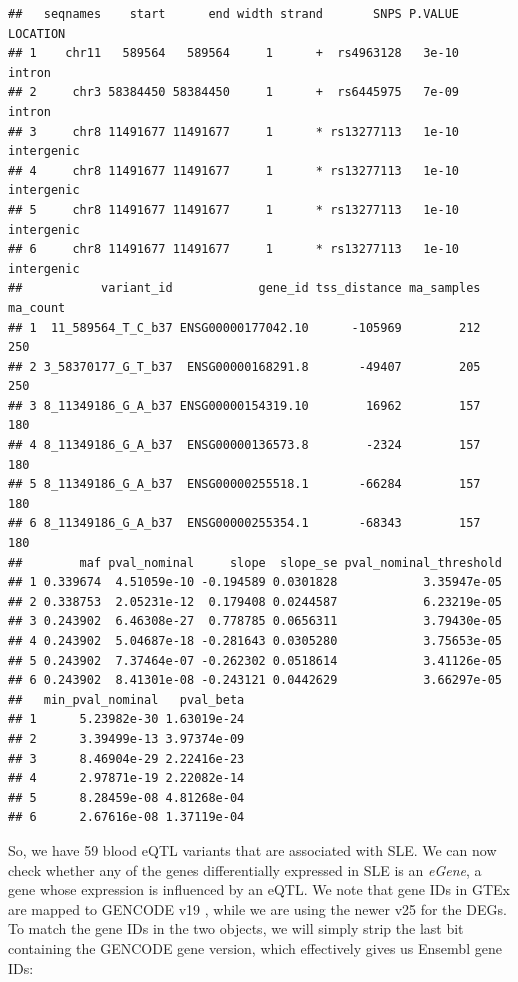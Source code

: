 \documentclass[9pt,a4paper,]{extarticle}
\begin{document}
\begin{verbatim}
##   seqnames    start      end width strand       SNPS P.VALUE   LOCATION
## 1    chr11   589564   589564     1      +  rs4963128   3e-10     intron
## 2     chr3 58384450 58384450     1      +  rs6445975   7e-09     intron
## 3     chr8 11491677 11491677     1      * rs13277113   1e-10 intergenic
## 4     chr8 11491677 11491677     1      * rs13277113   1e-10 intergenic
## 5     chr8 11491677 11491677     1      * rs13277113   1e-10 intergenic
## 6     chr8 11491677 11491677     1      * rs13277113   1e-10 intergenic
##           variant_id            gene_id tss_distance ma_samples ma_count
## 1  11_589564_T_C_b37 ENSG00000177042.10      -105969        212      250
## 2 3_58370177_G_T_b37  ENSG00000168291.8       -49407        205      250
## 3 8_11349186_G_A_b37 ENSG00000154319.10        16962        157      180
## 4 8_11349186_G_A_b37  ENSG00000136573.8        -2324        157      180
## 5 8_11349186_G_A_b37  ENSG00000255518.1       -66284        157      180
## 6 8_11349186_G_A_b37  ENSG00000255354.1       -68343        157      180
##        maf pval_nominal     slope  slope_se pval_nominal_threshold
## 1 0.339674  4.51059e-10 -0.194589 0.0301828            3.35947e-05
## 2 0.338753  2.05231e-12  0.179408 0.0244587            6.23219e-05
## 3 0.243902  6.46308e-27  0.778785 0.0656311            3.79430e-05
## 4 0.243902  5.04687e-18 -0.281643 0.0305280            3.75653e-05
## 5 0.243902  7.37464e-07 -0.262302 0.0518614            3.41126e-05
## 6 0.243902  8.41301e-08 -0.243121 0.0442629            3.66297e-05
##   min_pval_nominal   pval_beta
## 1      5.23982e-30 1.63019e-24
## 2      3.39499e-13 3.97374e-09
## 3      8.46904e-29 2.22416e-23
## 4      2.97871e-19 2.22082e-14
## 5      8.28459e-08 4.81268e-04
## 6      2.67616e-08 1.37119e-04
\end{verbatim}

So, we have 59 blood eQTL variants that are associated with SLE.
We can now check whether any of the genes differentially expressed in SLE is an \emph{eGene}, a gene whose expression is influenced by an eQTL.
We note that gene IDs in GTEx are mapped to GENCODE v19 \citep{GTEx2017}, while we are using the newer v25 for the DEGs.
To match the gene IDs in the two objects, we will simply strip the last bit containing the GENCODE gene version, which effectively gives us Ensembl gene IDs:
\end{document}
